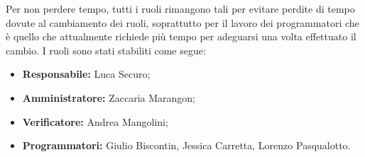 \noindent Per non perdere tempo, tutti i ruoli rimangono tali per evitare perdite di tempo dovute al cambiamento dei ruoli, soprattutto per il lavoro dei programmatori che è quello che attualmente richiede più tempo per adeguarsi una volta effettuato il cambio. I ruoli sono stati stabiliti come segue:
\begin{itemize}
    \item \textbf{Responsabile:} Luca Securo;
    \item \textbf{Amministratore:} Zaccaria Marangon;
    \item \textbf{Verificatore:} Andrea Mangolini;
    \item \textbf{Programmatori:} Giulio Biscontin, Jessica Carretta, Lorenzo Pasqualotto.
\end{itemize}